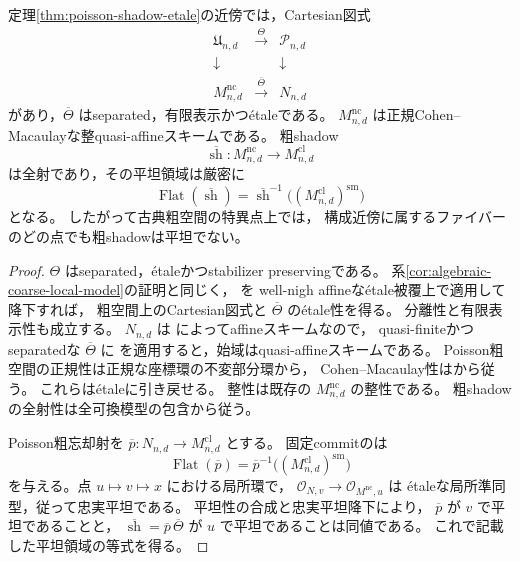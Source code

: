 \begin{theorem}
\label{thm:coarse-shadow-etale-flat-locus}
定理\ref{thm:poisson-shadow-etale}の近傍では，Cartesian図式
\[
\begin{array}{ccc}
\mathfrak U_{n,d}&\xrightarrow{\ \Theta\ }&\mathcal P_{n,d}\\
\downarrow&&\downarrow\\
M^{\mathrm{nc}}_{n,d}&\xrightarrow{\ \overline\Theta\ }&N_{n,d}
\end{array}
\]
があり，$\overline\Theta$ はseparated，有限表示かつ\'{e}taleである。
$M^{\mathrm{nc}}_{n,d}$ は正規Cohen--Macaulayな整quasi-affineスキームである。
粗shadow
\[
 \overline{\operatorname{sh}}:
 M^{\mathrm{nc}}_{n,d}\longrightarrow M^{\mathrm{cl}}_{n,d}
\]
は全射であり，その平坦領域は厳密に
\[
 \operatorname{Flat}(\overline{\operatorname{sh}})
 =
 \overline{\operatorname{sh}}^{-1}
 \bigl((M^{\mathrm{cl}}_{n,d})^{\mathrm{sm}}\bigr)
\]
となる。
したがって古典粗空間の特異点上では，
構成近傍に属するファイバーのどの点でも粗shadowは平坦でない。
\end{theorem}
\begin{proof}
$\Theta$ はseparated，\'{e}taleかつstabilizer preservingである。
系\ref{cor:algebraic-coarse-local-model}の証明と同じく，
\cite[Tags 0DUS, 0DUE]{StacksProject}を
well-nigh affineな\'{e}tale被覆上で適用して降下すれば，
粗空間上のCartesian図式と $\overline\Theta$ の\'{e}tale性を得る。
分離性と有限表示性も成立する。
$N_{n,d}$ は
\cite[定理9.2]{PoissonDP}によってaffineスキームなので，
quasi-finiteかつseparatedな $\overline\Theta$ に
\cite[Tag 082J]{StacksProject}を適用すると，始域はquasi-affineスキームである。
Poisson粗空間の正規性は正規な座標環の不変部分環から，
Cohen--Macaulay性は\cite[定理9.6]{PoissonDP}から従う。
これらは\'{e}taleに引き戻せる。
整性は既存の $M^{\mathrm{nc}}_{n,d}$ の整性である。
粗shadowの全射性は全可換模型の包含から従う。

Poisson粗忘却射を $\overline p:N_{n,d}\to M^{\mathrm{cl}}_{n,d}$ とする。
固定commitの\cite[定理9.6，\texttt{thm:coarse-flat-locus}]{PoissonDP}は
\[
 \operatorname{Flat}(\overline p)
 =\overline p^{-1}\bigl((M^{\mathrm{cl}}_{n,d})^{\mathrm{sm}}\bigr)
\]
を与える。点 $u\mapsto v\mapsto x$ における局所環で，
$\mathcal O_{N,v}\to\mathcal O_{M^{\mathrm{nc}},u}$ は
\'{e}taleな局所準同型，従って忠実平坦である。
平坦性の合成と忠実平坦降下により，
$\overline p$ が $v$ で平坦であることと，
$\overline{\operatorname{sh}}=\overline p\,\overline\Theta$ が $u$ で平坦であることは同値である。
これで記載した平坦領域の等式を得る。
\end{proof}

